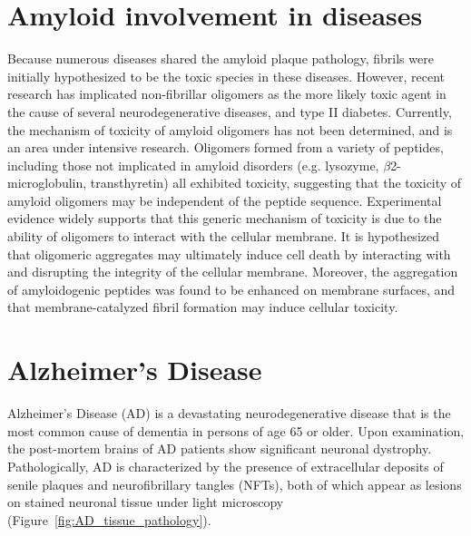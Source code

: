 \section{Amyloid involvement in diseases}

Because numerous diseases shared the amyloid plaque pathology, fibrils were initially hypothesized to be the toxic species in these diseases.\cite{Hardy:2002dh} However, recent research has implicated non-fibrillar oligomers as the more likely toxic agent in the cause of several neurodegenerative diseases, and type II diabetes.\cite{Haass:2007db,Xue:2009da,Berthelot:2013fs} %
Currently, the mechanism of toxicity of amyloid oligomers has not been determined, and is an area under intensive research.  Oligomers formed from a variety of peptides, including those not implicated in amyloid disorders (e.g. lysozyme, $\beta$2-microglobulin, transthyretin) all exhibited toxicity, suggesting that the toxicity of amyloid oligomers may be independent of the peptide sequence.\cite{Fandrich:2012kb,Kayed:2003en} Experimental evidence widely supports that this generic mechanism of toxicity is due to the ability of oligomers to interact with the cellular membrane.\cite{Martins:2008bz,Walsh:2007fu} It is hypothesized that oligomeric aggregates may ultimately induce cell death by interacting with and disrupting the integrity of the cellular membrane.\cite{Fandrich:2012kb} Moreover, the aggregation of amyloidogenic peptides was found to be enhanced on membrane surfaces,\cite{McLaurin:1997wm,Kayed:2004ul,Yip:2002vx} and that membrane-catalyzed fibril formation may induce cellular toxicity.\cite{Yip:2001tl}


\section{Alzheimer's Disease}
Alzheimer's Disease (AD) is a devastating neurodegenerative disease that is the most common cause of dementia in persons of age 65 or older. Upon examination, the post-mortem brains of AD patients show significant neuronal dystrophy. Pathologically, AD is characterized by the presence of extracellular deposits of senile plaques and neurofibrillary tangles (NFTs), both of which appear as lesions on stained neuronal tissue under light microscopy (Figure~\ref{fig:AD_tissue_pathology}).

